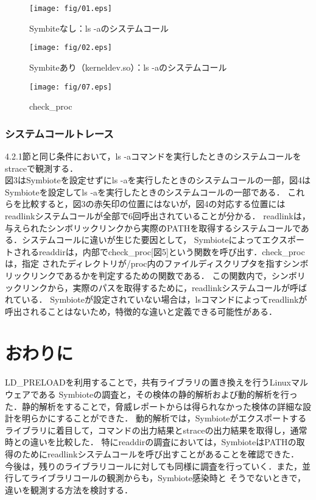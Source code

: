 \documentclass[submit,techreq,noauthor]{eco}	%
\begin{document}
\begin{figure*}[t]
	\centering
  \texttt{[image: fig/01.eps]}
	\caption{Symbiteなし：ls -aのシステムコール}
	\label{fig:s-ls}
\end{figure*}

\begin{figure*}[t]
	\centering
  \texttt{[image: fig/02.eps]}
	\caption{Symbiteあり（kerneldev.so）：ls -aのシステムコール}
	\label{fig:s-ls}
\end{figure*}

\begin{figure}[t]
	\centering
  \texttt{[image: fig/07.eps]}
	\caption{check\_proc}
	\label{fig:readdir}
\end{figure}

\subsubsection{システムコールトレース}
4.2.1節と同じ条件において，ls -aコマンドを実行したときのシステムコールをstraceで観測する．\\
図3はSymbioteを設定せずにls -aを実行したときのシステムコールの一部，図4はSymbioteを設定してls -aを実行したときのシステムコールの一部である．
これらを比較すると，図3の赤矢印の位置にはないが，図4の対応する位置にはreadlinkシステムコールが全部で6回呼出されていることが分かる． 
readlinkは，与えられたシンボリックリンクから実際のPATHを取得するシステムコールである．システムコールに違いが生じた要因として，
Symbioteによってエクスポートされるreaddirは，内部でcheck\_proc[図5]という関数を呼び出す．check\_procは，指定
されたディレクトリが/proc内のファイルディスクリプタを指すシンボリックリンクであるかを判定するための関数である．
この関数内で，シンボリックリンクから，実際のパスを取得するために，readlinkシステムコールが呼ばれている．
Symbioteが設定されていない場合は，lsコマンドによってreadlinkが呼出されることはないため，特徴的な違いと定義できる可能性がある．\\




\section{おわりに}
LD\_PRELOADを利用することで，共有ライブラリの置き換えを行うLinuxマルウェアである
Symbioteの調査と，その検体の静的解析および動的解析を行った．静的解析をすることで，脅威レポートからは得られなかった検体の詳細な設計を明らかにすることができた．
動的解析では，Symbioteがエクスポートするライブラリに着目して，コマンドの出力結果とstraceの出力結果を取得し，通常時との違いを比較した．
特にreaddirの調査においては，SymbioteはPATHの取得のためにreadlinkシステムコールを呼び出すことがあることを確認できた．\\
今後は，残りのライブラリコールに対しても同様に調査を行っていく．また，並行してライブラリコールの観測からも，Symbiote感染時と
そうでないときで，違いを観測する方法を検討する．

\setlength\baselineskip{12pt}
{\small
	
	
}
\end{document}
